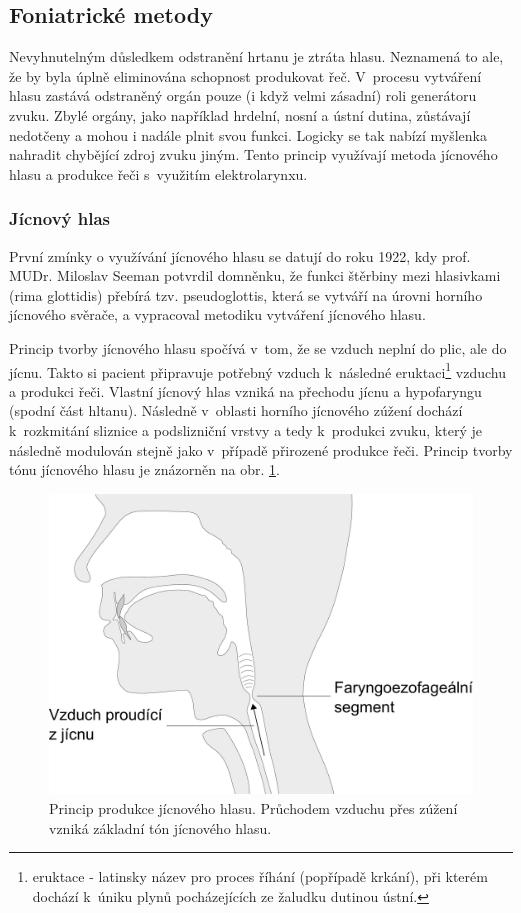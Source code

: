 \subsection{Foniatrické metody} %
\label{chap:cause:treatment:foniatric}

Nevyhnutelným důsledkem odstranění hrtanu je ztráta hlasu. Neznamená to ale, že by byla
úplně eliminována schopnost produkovat řeč. V~procesu vytváření hlasu zastává
odstraněný orgán pouze (i když velmi zásadní) roli generátoru zvuku. Zbylé
orgány, jako například hrdelní, nosní a ústní dutina, zůstávají nedotčeny a mohou i
nadále plnit svou funkci. Logicky se tak nabízí myšlenka nahradit chybějící
zdroj zvuku jiným. Tento princip využívají metoda jícnového hlasu a produkce řeči s~využitím
elektrolarynxu.

\subsubsection{Jícnový hlas} %
\label{chap:cause:treatment:foniatric:esophageal}

První zmínky o využívání jícnového hlasu se datují do roku 1922, kdy prof. MUDr. Miloslav Seeman
\cite{seeman1922speech} potvrdil domněnku, že funkci štěrbiny mezi hlasivkami (rima
glottidis) přebírá tzv. pseudoglottis, která se vytváří na úrovni horního
jícnového svěrače, a vypracoval metodiku vytváření jícnového
hlasu.

Princip tvorby jícnového hlasu spočívá v~tom, že se vzduch neplní do plic, ale do jícnu.
Takto si pacient připravuje potřebný vzduch  k~následné
eruktaci\footnote{eruktace - latinsky název pro proces říhání (popřípadě
krkání), při kterém dochází  k~úniku plynů pocházejících ze žaludku dutinou
ústní.} vzduchu a produkci řeči. Vlastní jícnový hlas vzniká na přechodu
jícnu a hypofaryngu (spodní část hltanu). Následně v~oblasti horního jícnového
zúžení dochází  k~rozkmitání sliznice a podslizniční vrstvy a tedy  k~produkci zvuku,
který je následně modulován stejně jako v~případě přirozené produkce řeči.
Princip tvorby  tónu jícnového hlasu je znázorněn na obr.
\ref{fig:cause:treatment:esophageal}.

\begin{figure}[htb]
  \begin{center}
    \includegraphics[width=0.6\linewidth]{ch3-cause/figures/esophageal}
    \caption[Princip produkce jícnového hlasu.]{Princip produkce jícnového hlasu. Průchodem vzduchu přes zúžení vzniká základní tón jícnového hlasu.}
    \label{fig:cause:treatment:esophageal}
  \end{center}
\end{figure}

